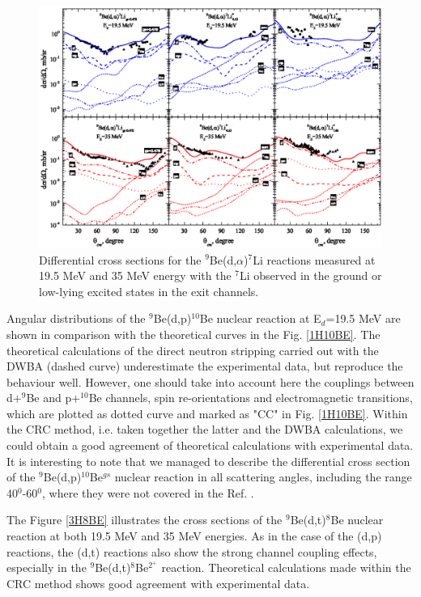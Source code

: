 \documentclass[10pt]{iopart}
\begin{document}
\begin{figure}[bp]
\centering
\includegraphics[scale=0.9]{4HE7LI.eps}
\caption{\label{label} Differential cross sections for the ${}^9$Be(d,$\alpha$)${}^7$Li reactions measured at 19.5 MeV and 35 MeV energy with the ${}^{7}$Li observed in the ground or low-lying excited states in the exit channels.}
\label{4HE7LI}
\end{figure}	

Angular distributions of the ${}^9$Be(d,p)${}^{10}$Be nuclear reaction at E$_d$=19.5 MeV are shown in comparison with the theoretical curves in the Fig. \ref{1H10BE}.
The theoretical calculations of the direct neutron stripping carried out with the DWBA (dashed curve) underestimate the experimental data, but reproduce the behaviour well.
However, one should take into account here the couplings between d+$^9$Be and p+$^{10}$Be channels, spin re-orientations and electromagnetic transitions, which are plotted as dotted curve and marked as "CC" in Fig. \ref{1H10BE}.
Within the CRC method, i.e. taken together the latter and the DWBA calculations, we could obtain a good agreement of theoretical calculations with experimental data. It is interesting to note that we managed to describe the differential cross section of the ${}^9$Be(d,p)${}^{10}$Be$^{gs}$ nuclear reaction in all scattering angles, including the range 40$^0$-60$^0$, where they were not covered in the Ref. \cite{galanina2012, bodek1989}.

The Figure \ref{3H8BE} illustrates the cross sections of the ${}^9$Be(d,t)${}^{8}$Be nuclear reaction at both 19.5 MeV and 35 MeV energies. As in the case of the (d,p) reactions, the (d,t) reactions also show the strong channel coupling effects, especially in the ${}^9$Be(d,t)${}^{8}$Be$^{2^+}$ reaction. Theoretical calculations made within the CRC method shows good agreement with experimental data.
\end{document}
